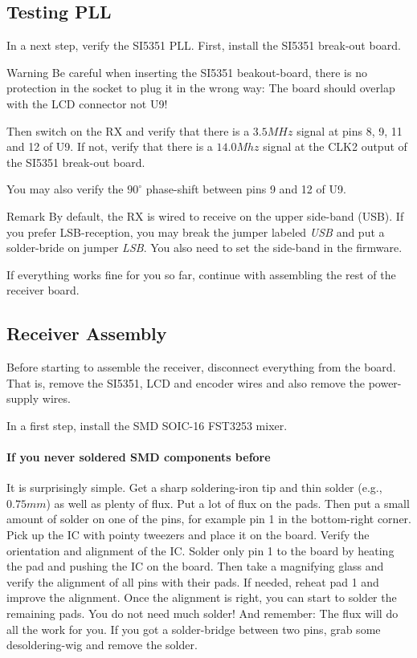 \documentclass[10pt, a4paper]{scrartcl}
\newenvironment{remark}{\begin{bclogo}[couleur=blue!30,arrondi=.1,logo=\bcinfo,ombre=true]{Remark}}{\end{bclogo}}
\newenvironment{warning}{\begin{bclogo}[couleur=red!30,arrondi=.1,logo=\bcattention,ombre=true]{Warning}}{\end{bclogo}}
\begin{document}
\subsection{Testing PLL}
In a next step, verify the SI5351 PLL. First, install the SI5351 break-out board. 

\begin{warning}
 Be careful when inserting the SI5351 beakout-board, there is no protection in the socket to plug it in the wrong way: The board should overlap with the LCD connector not U9!
\end{warning}
 
Then switch on the RX and verify that there is a $3.5MHz$ signal at pins 8, 9, 11 and 12 of U9. If not, verify that there is a $14.0Mhz$ signal at the CLK2 output of the SI5351 break-out board. 

You may also verify the $90^\circ$ phase-shift between pins 9 and 12 of U9.

\begin{remark}
By default, the RX is wired to receive on the upper side-band (USB). If you prefer LSB-reception, you may break the jumper labeled \emph{USB} and put a solder-bride on jumper \emph{LSB}. You also need to set the side-band in the firmware.
\end{remark} 

If everything works fine for you so far, continue with assembling the rest of the receiver board.


\subsection{Receiver Assembly}
Before starting to assemble the receiver, disconnect everything from the board. That is, remove the SI5351, LCD and encoder wires and also remove the power-supply wires.

In a first step, install the SMD SOIC-16 FST3253 mixer. 

\paragraph{If you never soldered SMD components before} It is surprisingly simple. Get a sharp soldering-iron tip and thin solder (e.g., $0.75mm$) as well as plenty of flux. Put a lot of flux on the pads. Then put a small amount of solder on one of the pins, for example pin 1 in the bottom-right corner. Pick up the IC with pointy tweezers and place it on the board. Verify the orientation and alignment of the IC. Solder only pin 1 to the board by heating the pad and pushing the IC on the board. Then take a magnifying glass and verify the alignment of all pins with their pads. If needed, reheat pad 1 and improve the alignment. Once the alignment is right, you can start to solder the remaining pads. You do not need much solder! And remember: The flux will do all the work for you. If you got a solder-bridge between two pins, grab some desoldering-wig and remove the solder. 
\end{document}
